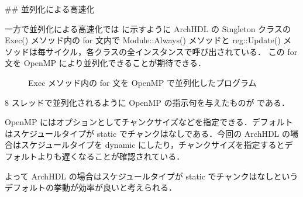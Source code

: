 ## 並列化による高速化 \label{ss:parallel}

一方で並列化による高速化では  に示すように
ArchHDL の Singleton クラスの Exec() メソッド内の
for 文内で Module::Always() メソッドと
reg::Update() メソッドは毎サイクル，各クラスの全インスタンスで呼び出されている．
この for 文を OpenMP により並列化できることが期待できる．

\begin{figure}[t]
 
 \caption{Exec メソッド内の for 文を OpenMP で並列化したプログラム}
 \label{src:exec_openmp}
\end{figure}

8 スレッドで並列化されるように OpenMP の指示句を与えたものが  である．

OpenMP にはオプションとしてチャンクサイズなどを指定できる．デフォルトはスケジュールタイプが
static でチャンクはなしである．今回の ArchHDL の場合はスケジュールタイプを dynamic
にしたり，チャンクサイズを指定するとデフォルトよりも遅くなることが確認されている．

よって ArchHDL の場合はスケジュールタイプが static でチャンクはなしというデフォルトの挙動が効率が良いと考えられる．

